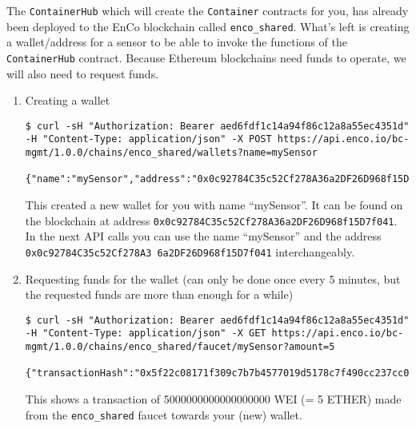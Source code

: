 \documentclass[12pt]{article}
\begin{document}
The \texttt{ContainerHub} which will create the \texttt{Container} contracts for you, has already been deployed to the EnCo blockchain called \texttt{enco\_shared}. What's left is creating a wallet/address for a sensor to be able to invoke the functions of the \texttt{ContainerHub} contract. Because Ethereum blockchains need funds to operate, we will also need to request funds.

\begin{enumerate}
	\item Creating a wallet
		\begin{lstlisting}[frame=single,basicstyle=\tiny]
$ curl -sH "Authorization: Bearer aed6fdf1c14a94f86c12a8a55ec4351d" -H "Content-Type: application/json" -X POST https://api.enco.io/bc-mgmt/1.0.0/chains/enco_shared/wallets?name=mySensor

{"name":"mySensor","address":"0x0c92784C35c52Cf278A36a2DF26D968f15D7f041"}
		\end{lstlisting}
		This created a new wallet for you with name ``mySensor''. It can be found on the blockchain at address \texttt{0x0c92784C35c52Cf278A36a2DF26D968f15D7f041}. In the next API calls you can use the name ``mySensor'' and the address \texttt{0x0c92784C35c52Cf278A3 6a2DF26D968f15D7f041} interchangeably.
	\item Requesting funds for the wallet (can only be done once every 5 minutes, but the requested funds are more than enough for a while)
		\begin{lstlisting}[frame=single,basicstyle=\tiny]
$ curl -sH "Authorization: Bearer aed6fdf1c14a94f86c12a8a55ec4351d" -H "Content-Type: application/json" -X GET https://api.enco.io/bc-mgmt/1.0.0/chains/enco_shared/faucet/mySensor?amount=5

{"transactionHash":"0x5f22c08171f309c7b7b4577019d5178c7f490cc237cc0c3da330447b9b0777a3","fromAddress":"0x3Bd9400C0a27c2cB6D5cF32e376Af7Ef5Fe9C929","toAddress":"0x0c92784C35c52Cf278A36a2DF26D968f15D7f041","value":5000000000000000000,"nonce":12,"gasLimit":21000,"gasPrice":22000000000}
		\end{lstlisting}
		This shows a transaction of \num{5000000000000000000} WEI (= 5 ETHER) made from the \texttt{enco\_shared} faucet towards your (new) wallet.
\end{enumerate}
\end{document}
